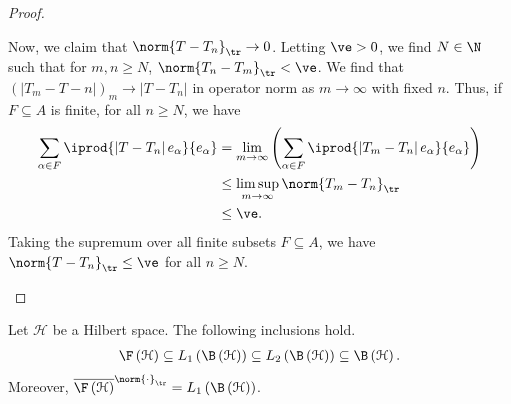 \documentclass[10pt]{mypackage}
\begin{document}
\begin{proof}
\begin{enumerate}[(1)]
      Now, we claim that $\norm{T - T_n}_{\tr}\rightarrow 0$. Letting $\ve > 0$, we find $N\in \N$ such that for $m,n\geq N$, $\norm{T_n - T_m}_{\tr} < \ve$. We find that $\left( \left\vert T_m - T-n \right\vert \right)_{m}\rightarrow \left\vert T - T_n \right\vert$ in operator norm as $m\rightarrow\infty$ with fixed $n$. Thus, if $F\subseteq A$ is finite, for all $n\geq N$, we have
      \begin{align*}
        \sum_{\alpha \in F} \iprod{\left\vert T - T_n \right\vert e_{\alpha}}{e_{\alpha}} &= \lim_{m\rightarrow\infty} \left( \sum_{\alpha \in F} \iprod{\left\vert T_m - T_n \right\vert e_{\alpha}}{e_{\alpha}} \right)\\
                                                                                          &\leq \limsup_{m\rightarrow\infty} \norm{T_m - T_n}_{\tr}\\
                                                                                          &\leq \ve.
      \end{align*}
      Taking the supremum over all finite subsets $F\subseteq A$, we have $\norm{T - T_n}_{\tr} \leq \ve$ for all $n\geq N$.
  \end{enumerate}
\end{proof}
\begin{proposition}
  Let $\mathcal{H}$ be a Hilbert space. The following inclusions hold.
  \begin{align*}
    \F\left( \mathcal{H} \right) \subseteq L_1\left( \B\left( \mathcal{H} \right) \right) \subseteq L_2\left( \B\left( \mathcal{H} \right) \right)\subseteq \B\left( \mathcal{H} \right).
  \end{align*}
  Moreover, $\overline{\F\left( \mathcal{H} \right)}^{\norm{\cdot}_{\tr}} = L_1\left( \B\left( \mathcal{H} \right) \right)$.
\end{proposition}
\end{document}
